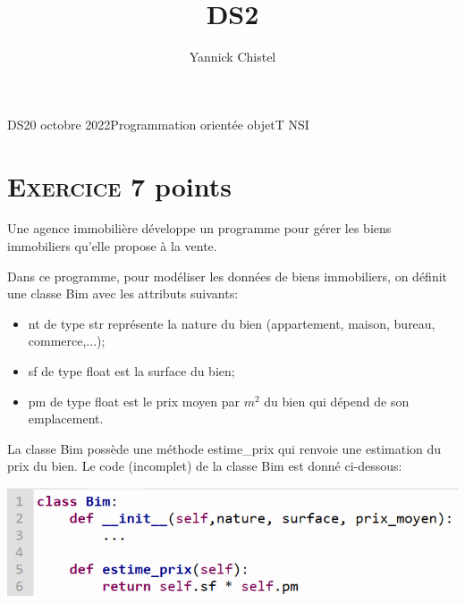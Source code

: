 \documentclass[11pt,a4paper]{article}
\author{Yannick Chistel}
\title{DS2}
\newcounter{num}
\begin{document}
\begin{headDS}
{DS}{20 octobre 2022}{Programmation orientée objet}{T NSI}
\end{headDS}
	


\section*{\textsc{Exercice \thenum } \hfill 7 points}
Une agence immobilière développe un programme pour gérer les biens immobiliers qu'elle propose à la vente.

Dans ce programme, pour modéliser les données de biens immobiliers, on définit une classe \textsf{Bim} avec les attributs suivants:

\begin{itemize}
\item \textsf{nt} de type \textsf{str} représente la nature du bien (appartement, maison, bureau, commerce,...);
\item \textsf{sf} de type \textsf{float} est la surface du bien;
\item \textsf{pm} de type \textsf{float} est le prix moyen par $m^{2}$ du bien qui dépend de son emplacement.
\end{itemize}

La classe \textsf{Bim} possède une méthode \textsf{estime\_prix} qui renvoie une estimation du prix du bien. Le code (incomplet) de la classe \textsf{Bim} est donné ci-dessous:

\begin{center}
\includegraphics[scale=0.8]{../img/ds_bim_classe.png}
\end{center}
\end{document}
